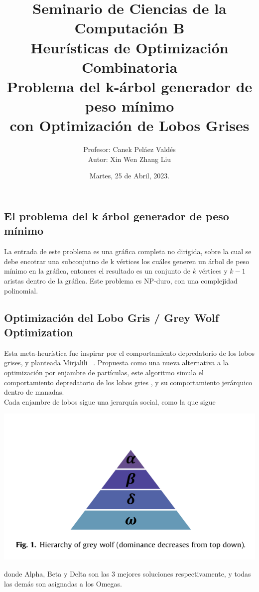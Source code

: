 \documentclass[a4paper]{article}
\title { \Large{Seminario de Ciencias de la Computaci\'on B}\protect\\
  \large{Heurísticas de Optimización Combinatoria}\protect\\
  \large{Problema del k-\'arbol generador de peso m\'inimo\\con Optimización de Lobos Grises}}
\date{\normalsize{Martes, 25 de Abril, 2023.}}
\author{\normalsize{Profesor: Canek Peláez Valdés}\protect\\
  \normalsize{Autor: Xin Wen Zhang Liu}}\vspace{0.2cm}
\begin{document}
\allowdisplaybreaks
\maketitle

\subsection*{El problema del k \'arbol generador de peso m\'inimo}
La entrada de este problema es una gr\'afica completa no dirigida, sobre la cual se debe encotrar una subconjutno de k v\'ertices los cu\'ales generen un \'arbol de peso m\'inimo en la gr\'afica, entonces el resultado es un conjunto de $k$ v\'ertices y $k-1$ aristas dentro de la gr\'afica. Este problema es NP-duro, con una complejidad polinomial.


\subsection*{Optimizaci\'on del Lobo Gris / Grey Wolf Optimization}
Esta meta-heur\'istica fue inspirar por el comportamiento depredatorio de los lobos grises, y planteada Mirjalili
~\cite{MIRJALILI201446}. Propuesta como una nueva alternativa a la optimización por enjambre de
part\'iculas, este algoritmo simula el comportamiento depredatorio de los lobos gries , y su comportamiento jer\'arquico dentro de manadas.\\

Cada enjambre de lobos sigue una jerarqu\'ia social, como la que sigue
\begin{center}
  \includegraphics[width=\textwidth]{1682483544.png}
\end{center}

donde Alpha, Beta y Delta son las 3 mejores soluciones respectivamente, y todas las dem\'as son asignadas a los Omegas.
\end{document}
